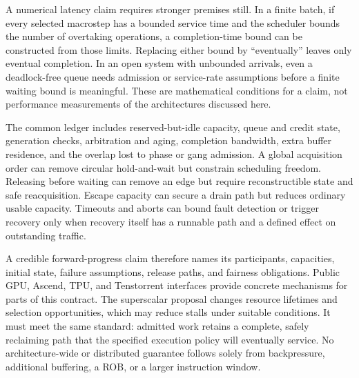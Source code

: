 A numerical latency claim requires stronger premises still. In a finite batch, if every selected macrostep has a bounded service time and the scheduler bounds the number of overtaking operations, a completion-time bound can be constructed from those limits. Replacing either bound by ``eventually'' leaves only eventual completion. In an open system with unbounded arrivals, even a deadlock-free queue needs admission or service-rate assumptions before a finite waiting bound is meaningful. These are mathematical conditions for a claim, not performance measurements of the architectures discussed here.

The common ledger includes reserved-but-idle capacity, queue and credit state, generation checks, arbitration and aging, completion bandwidth, extra buffer residence, and the overlap lost to phase or gang admission. A global acquisition order can remove circular hold-and-wait but constrain scheduling freedom. Releasing before waiting can remove an edge but require reconstructible state and safe reacquisition. Escape capacity can secure a drain path but reduces ordinary usable capacity. Timeouts and aborts can bound fault detection or trigger recovery only when recovery itself has a runnable path and a defined effect on outstanding traffic.

A credible forward-progress claim therefore names its participants, capacities, initial state, failure assumptions, release paths, and fairness obligations. Public GPU, Ascend, TPU, and Tenstorrent interfaces provide concrete mechanisms for parts of this contract. The superscalar proposal changes resource lifetimes and selection opportunities, which may reduce stalls under suitable conditions. It must meet the same standard: admitted work retains a complete, safely reclaiming path that the specified execution policy will eventually service. No architecture-wide or distributed guarantee follows solely from backpressure, additional buffering, a ROB, or a larger instruction window.
